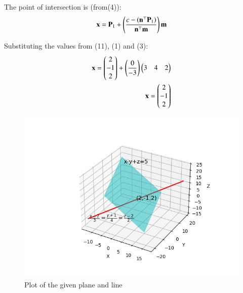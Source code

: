 \documentclass[journal]{IEEEtran}
\begin{document}
The point of intersection is (from(4)):
\begin{align}
    \mathbf{x}=\mathbf{P}_1+\left(\frac{c-(\mathbf{n}^\top\mathbf{P}_1)}{\mathbf{n}^\top\mathbf{m}}\right)\mathbf{m}
\end{align}

Substituting the values from (11), (1) and (3):
\begin{align}
    \mathbf{x}=\begin{pmatrix}2\\-1\\2\end{pmatrix}+\left(\frac{0}{-3}\right)\begin{pmatrix}3&4&2\end{pmatrix}\\
    \mathbf{x}=\begin{pmatrix}2\\-1\\2\end{pmatrix}
\end{align}

\begin{figure}[h!]
   \centering
   \includegraphics[width=0.7\linewidth]{figs/plot.png}
   \caption{Plot of the given plane and line}
   \label{}
\end{figure}
\end{document}
